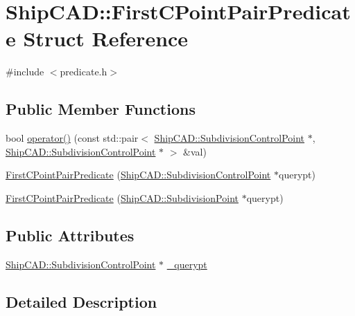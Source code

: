 \hypertarget{structShipCAD_1_1FirstCPointPairPredicate}{}\section{Ship\+C\+AD\+:\+:First\+C\+Point\+Pair\+Predicate Struct Reference}
\label{structShipCAD_1_1FirstCPointPairPredicate}


{\ttfamily \#include $<$predicate.\+h$>$}

\subsection*{Public Member Functions}
\begin{DoxyCompactItemize}
\item 
bool \hyperlink{structShipCAD_1_1FirstCPointPairPredicate_a294ff0c7585171a6e336c78901d5cc09}{operator()} (const std\+::pair$<$ \hyperlink{classShipCAD_1_1SubdivisionControlPoint}{Ship\+C\+A\+D\+::\+Subdivision\+Control\+Point} $\ast$, \hyperlink{classShipCAD_1_1SubdivisionControlPoint}{Ship\+C\+A\+D\+::\+Subdivision\+Control\+Point} $\ast$ $>$ \&val)
\item 
\hyperlink{structShipCAD_1_1FirstCPointPairPredicate_a2c8307c90bcf0f16bf3ac3b7b8a92264}{First\+C\+Point\+Pair\+Predicate} (\hyperlink{classShipCAD_1_1SubdivisionControlPoint}{Ship\+C\+A\+D\+::\+Subdivision\+Control\+Point} $\ast$querypt)
\item 
\hyperlink{structShipCAD_1_1FirstCPointPairPredicate_a64d5b1521a10585bede992002bc0c19f}{First\+C\+Point\+Pair\+Predicate} (\hyperlink{classShipCAD_1_1SubdivisionPoint}{Ship\+C\+A\+D\+::\+Subdivision\+Point} $\ast$querypt)
\end{DoxyCompactItemize}
\subsection*{Public Attributes}
\begin{DoxyCompactItemize}
\item 
\hyperlink{classShipCAD_1_1SubdivisionControlPoint}{Ship\+C\+A\+D\+::\+Subdivision\+Control\+Point} $\ast$ \hyperlink{structShipCAD_1_1FirstCPointPairPredicate_a90bf572fb8074e88e02ecfe218515129}{\+\_\+querypt}
\end{DoxyCompactItemize}


\subsection{Detailed Description}


